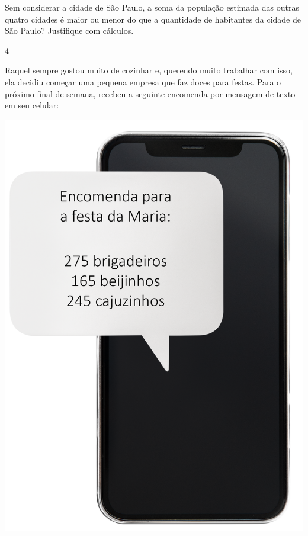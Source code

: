 Sem considerar a cidade de São Paulo, a soma da população estimada das
outras quatro cidades é maior ou menor do que a quantidade de habitantes
da cidade de São Paulo? Justifique com cálculos.



\num{4}

\begin{minipage}{.5\textwidth}
Raquel sempre gostou muito de cozinhar e,
querendo muito trabalhar com isso, ela decidiu começar uma pequena
empresa que faz doces para festas. Para o próximo final de semana, recebeu a seguinte encomenda por mensagem de texto em seu celular:
\end{minipage}\hspace{.5cm}
\begin{minipage}{.3\textwidth}
\includegraphics[width=\textwidth]{../ilustracoes/MAT5/SAEB_5ANO_MAT_figura18.png}
\end{minipage}

